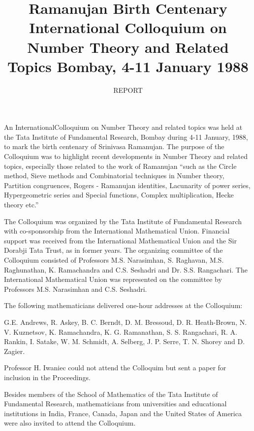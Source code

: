 \title{Ramanujan Birth Centenary International Colloquium on Number Theory and Related Topics
\break
{\fontsize{13}{15}\selectfont Bombay, 4-11 January 1988}}

\author{REPORT}
\date{}
\maketitle

\thispagestyle{empty}

An International\pageoriginale Colloquium on Number Theory and related topics was held at the Tata Institute of Fundamental Research, Bombay during 4-11 January, 1988, to mark the birth centenary of Srinivasa Ramanujan. The purpose of the Colloquium was to highlight recent developments in Number Theory and related topics, especially those related to the work of Ramanujan ``such as the Circle method, Sieve methods and Combinatorial techniques in Number theory, Partition congruences,  Rogers - Ramanujan identities, Lacunarity of power series, Hypergeometric series and Special functions, Complex multiplication, Hecke theory etc.''

\medskip

The Colloquium was organized by the Tata Institute of Fundamental Research with co-sponsorship from the International Mathematical Union. Financial support was received from the International Mathematical Union and the Sir Dorabji Tata Trust, as in former years. The organizing committee of the Colloquium consisted of Professors M.S. Narasimhan, S. Raghavan, M.S. Raghunathan, K. Ramachandra and C.S. Seshadri and Dr. S.S. Rangachari. The International Mathematical Union was represented on the committee by Professors M.S. Narasimhan and C.S. Seshadri. 

\medskip

The following mathematicians delivered one-hour addresses at the Colloquium: 

\medskip

G.E. Andrews, R. Askey, B. C. Berndt, D. M. Bressoud, D. R. Heath-Brown, N. V. Kuznetsov, K. Ramachandra, K. G. Ramanathan, S. S. Rangachari, R. A. Rankin, I. Satake, W. M. Schmidt, A. Selberg, J. P. Serre, T. N. Shorey and D. Zagier. 

\medskip

Professor H. Iwaniec could not attend the Colloquim but sent a paper for inclusion in the Proceedings. 

\medskip

Besides members of the School of Mathematics of the Tata Institute of Fundamental Research, mathematicians from universities and educational institutions in India, France, Canada, Japan and the United States of America were also invited to attend the Colloquium. 

